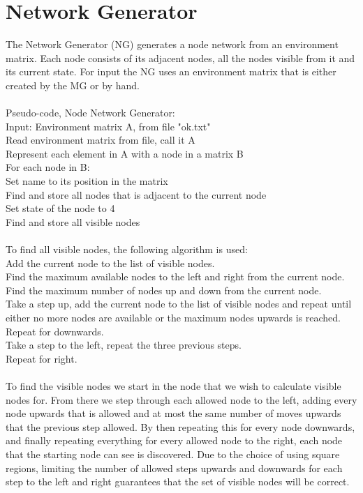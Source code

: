 \section{Network Generator}
The Network Generator (NG) generates a node network from an environment matrix. Each node consists of its adjacent nodes, all the nodes visible from it and its current state. For input the NG uses an environment matrix that is either created by the MG or by hand.\\
\\
\noindent Pseudo-code, Node Network Generator:\\
\indent Input: Environment matrix A, from file "ok.txt"\\
\indent Read environment matrix from file, call it A\\
\indent Represent each element in A with a node in a matrix B\\
\indent For each node in B:\\
\indent \indent Set name to its position in the matrix\\
\indent \indent Find and store all nodes that is adjacent to the current node\\
\indent \indent Set state of the node to 4\\
\indent \indent Find and store all visible nodes\\
\\
To find all visible nodes, the following algorithm is used:\\
\indent Add the current node to the list of visible nodes.\\
\indent Find the maximum available nodes to the left and right from the current node.\\
\indent Find the maximum number of nodes up and down from the current node.\\
\indent Take a step up, add the current node to the list of visible nodes and repeat until
\indent either no more nodes are available or the maximum nodes upwards is reached.\\
\indent Repeat for downwards.\\
\indent Take a step to the left, repeat the three previous steps.\\
\indent Repeat for right.\\
\\
To find the visible nodes we start in the node that we wish to calculate visible nodes for. From there we step through each allowed node to the left, adding every node upwards that is allowed and at most the same number of moves upwards that the previous step allowed. By then repeating this for every node downwards, and finally repeating everything for every allowed node to the right, each node that the starting node can see is discovered. Due to the choice of using square regions, limiting the number of allowed steps upwards and downwards for each step to the left and right guarantees that the set of visible nodes will be correct.
